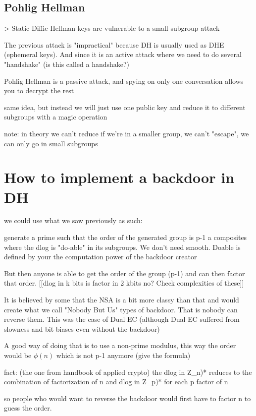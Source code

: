 \documentclass[a4paper,11pt]{article}
\begin{document}
\subsection{Pohlig Hellman}

> Static Diffie-Hellman keys are vulnerable to a small subgroup attack

The previous attack is "impractical" because DH is usually used as DHE (ephemeral keys). And since it is an active attack where we need to do several "handshake" (is this called a handshake?)

Pohlig Hellman is a passive attack, and spying on only one conversation allows you to decrypt the rest

same idea, but instead we will just use one public key and reduce it to different subgroups with a magic operation

note: in theory we can't reduce if we're in a smaller group, we can't "escape", we can only go in small subgroups

\section{How to implement a backdoor in DH}

we could use what we saw previously as such:

generate a prime such that the order of the generated group is p-1 a composites where the dlog is "do-able" in its subgroups. We don't need smooth. Doable is defined by your the computation power of the backdoor creator

But then anyone is able to get the order of the group (p-1) and can then factor that order. [[dlog in k bits is factor in 2 kbits no? Check complexities of these]]

It is believed by some that the NSA is a bit more classy than that and would create what we call "Nobody But Us" types of backdoor. That is nobody can reverse them. This was the case of Dual EC (although Dual EC suffered from slowness and bit biases even without the backdoor)

A good way of doing that is to use a non-prime modulus, this way the order would be $\phi(n)$ which is not p-1 anymore (give the formula)

fact: (the one from handbook of applied crypto)
the dlog in Z_n)* reduces to the combination of factorization of n and dlog in Z_p)* for each p factor of n

so people who would want to reverse the backdoor would first have to factor n to guess the order.
\end{document}
